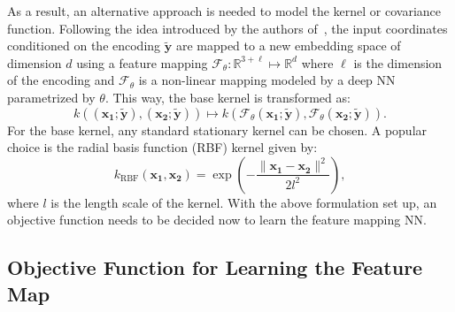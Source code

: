         As a result, an alternative approach is needed to model the kernel or covariance function. Following the idea introduced by the authors of~\cite{DKL}, the input coordinates conditioned on the encoding $\mathbf{\tilde{y}}$ are mapped to a new embedding space of dimension $d$ using a feature mapping $\mathcal{F}_\theta: \mathbb{R}^{3+\ell} \mapsto \mathbb{R}^d$ where $\ell$ is the dimension of the encoding and $\mathcal{F}_\theta$ is a non-linear mapping modeled by a deep NN parametrized by $\theta$. This way, the base kernel is transformed as:
        \begin{equation}\label{dkl}
            k((\mathbf{x_1}; \mathbf{\tilde{y}}),  (\mathbf{x_2}; \mathbf{\tilde{y}})) \mapsto k(\mathcal{F}_\theta(\mathbf{x_1}; \mathbf{\tilde{y}}),  \mathcal{F}_\theta(\mathbf{x_2}; \mathbf{\tilde{y}})).
        \end{equation}
        For the base kernel, any standard stationary kernel can be chosen. A popular choice is the radial basis function (RBF) kernel given by:
        \begin{equation}
            k_{\text{RBF}}(\mathbf{x_1},  \mathbf{x_2}) = \exp \left(-\frac{\|\mathbf{x_1}-\mathbf{x_2}\|^2}{2l^2}\right),
        \end{equation}
        where $l$ is the length scale of the kernel. With the above formulation set up, an objective function needs to be decided now to learn the feature mapping NN.


        \subsection{Objective Function for Learning the Feature Map}
